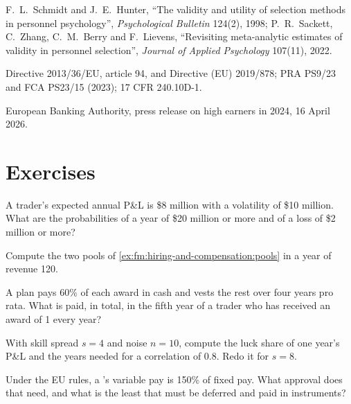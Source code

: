 \begin{omsources}
\item F.~L.~Schmidt and J.~E.~Hunter, ``The validity and utility of selection methods in personnel psychology'', \emph{Psychological Bulletin}
124(2), 1998; P.~R.~Sackett, C.~Zhang, C.~M.~Berry and F.~Lievens, ``Revisiting meta-analytic estimates of validity in personnel selection'',
\emph{Journal of Applied Psychology} 107(11), 2022.
\item Directive 2013/36/EU, article 94, and Directive (EU) 2019/878; PRA PS9/23 and FCA PS23/15 (2023); 17 CFR 240.10D-1.
\item European Banking Authority, press release on high earners in 2024, 16 April 2026.
\end{omsources}

\section{Exercises}

\begin{exercise}[$\star$]\label{exo:fm:hiring-and-compensation:1}
A trader's expected annual P\&L is \$8 million with a volatility of \$10 million. What are the probabilities of a year of \$20 million or more and
of a loss of \$2 million or more?
\end{exercise}

\begin{exercise}[$\star$]\label{exo:fm:hiring-and-compensation:2}
Compute the two pools of \cref{ex:fm:hiring-and-compensation:pools} in a year of revenue 120.
\end{exercise}

\begin{exercise}[$\star$]\label{exo:fm:hiring-and-compensation:3}
A plan pays 60\% of each award in cash and vests the rest over four years pro rata. What is paid, in total, in the fifth year of a trader who has
received an award of 1 every year?
\end{exercise}

\begin{exercise}[$\star\star$]\label{exo:fm:hiring-and-compensation:4}
With skill spread $s=4$ and noise $n=10$, compute the luck share of one year's P\&L and the years needed for a correlation of 0.8. Redo it for
$s=8$.
\end{exercise}

\begin{exercise}[$\star\star$]\label{exo:fm:hiring-and-compensation:5}
Under the EU rules, a 's variable pay is 150\% of fixed pay. What approval does that need, and what is the least that must be
deferred and paid in instruments?
\end{exercise}

